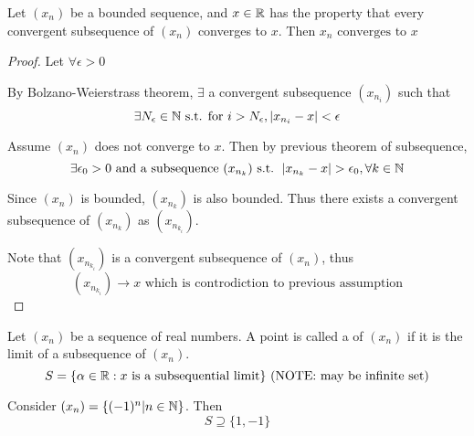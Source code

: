 \documentclass[a4paper,12pt]{article}
\begin{document}
    \begin{theorem}
        Let \((x_n)\) be a bounded sequence, and \(x\in\mathbb{R}\) has the property that every convergent subsequence of \((x_n)\) converges to \(x\). 
        Then \(x_n \text{ converges to } x\)
        \begin{proof}
            Let \(\forall\epsilon>0\)

            By Bolzano-Weierstrass theorem, \(\exists\) a convergent subsequence \((x_{n_i})\) such that
            \[\exists N_\epsilon\in\mathbb{N} \text{ s.t. for } i>N_\epsilon, \left\lvert x_{n_i}-x\right\rvert<\epsilon\]
            
            Assume \((x_n)\) does not converge to \(x\). Then by previous theorem of subsequence,
            \[\exists \epsilon_0 >0 \text{ and a subsequence }(x_{n_k}) \text{ s.t. }\left\lvert x_{n_k}-x\right\rvert>\epsilon_0, \forall k\in\mathbb{N}\]
            
            Since \((x_n)\) is bounded, \((x_{n_k})\) is also bounded. Thus there exists a convergent subsequence of \((x_{n_k})\) as \((x_{n_{k_i}})\).

            Note that \((x_{n_{k_i}})\) is a convergent subsequence of \((x_n)\), thus 
            \[(x_{n_{k_i}})\rightarrow x\text{ which is controdiction to previous assumption}\]
        \end{proof}
    \end{theorem}
    \begin{definition}
        Let \((x_n)\) be a sequence of real numbers. A point is called a  of \((x_n)\) if it is the limit of a subsequence of \((x_n)\).
        \[S = \{\alpha \in\mathbb{R}:x\text{ is a subsequential limit}\}\text{ (NOTE: may be infinite set)}\]
        \begin{example}
            Consider \((x_{n})=\{(-1)^n|n\in\mathbb{N}\}\). Then 
            \[S \supseteq \{1,-1\}\]
        \end{example}

    \end{definition}
\end{document}
